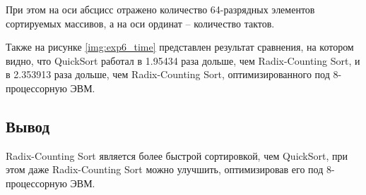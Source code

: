 При этом на оси абсцисс отражено количество 64-разрядных элементов сортируемых массивов, а на оси ординат -- количество тактов.




Также на рисунке \ref{img:exp6_time} представлен результат сравнения, на котором видно, что QuickSort работал в 1.95434 раза дольше, чем Radix-Counting Sort, и в 2.353913 раза дольше, чем Radix-Counting Sort, оптимизированного под 8-процессорную ЭВМ.


\clearpage



\subsection{Вывод}

Radix-Counting Sort является более быстрой сортировкой, чем QuickSort, при этом даже Radix-Counting Sort можно улучшить, оптимизировав его под 8-процессорную ЭВМ.

